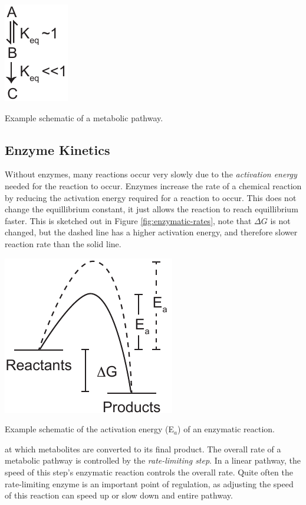 \documentclass{tufte-handout}
\begin{document}
\begin{marginfigure}
\includegraphics[width=0.5\marginparwidth]{figures/committed-step.pdf}\
\caption{Example schematic of a metabolic pathway.}
\label{fig:committed-step}
\end{marginfigure}

\subsection{Enzyme Kinetics}

Without enzymes, many reactions occur very slowly due to the \emph{activation energy} needed for the reaction to occur.  Enzymes increase the rate of a chemical reaction by reducing the activation energy required for a reaction to occur.  This does not change the equillibrium constant, it just allows the reaction to reach equillibrium faster.  This is sketched out in Figure \ref{fig:enzymatic-rates}, note that $\Delta G$ is not changed, but the dashed line has a higher activation energy, and therefore slower reaction rate than the solid line.  

\begin{marginfigure}
\includegraphics[width=\marginparwidth]{figures/enzymatic-rates.pdf}\
\caption{Example schematic of the activation energy (E$_a$) of an enzymatic reaction.}
\label{fig:enzymatic-rates}
\end{marginfigure}

 at which metabolites are converted to its final product. The overall rate of a metabolic pathway is controlled by the \emph{rate-limiting step}.  In a linear pathway, the speed of this step's enzymatic reaction controls the overall rate.  Quite often the rate-limiting enzyme is an important point of regulation, as adjusting the speed of this reaction can speed up or slow down and entire pathway.  
\end{document}
